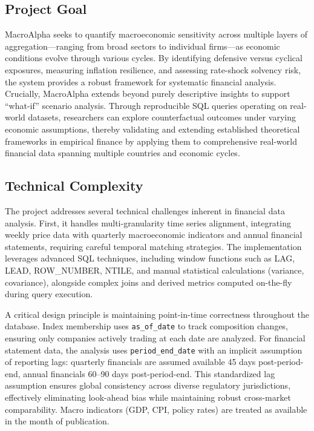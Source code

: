 \documentclass[10pt,a4paper]{article}
\begin{document}
\subsection{Project Goal}
MacroAlpha seeks to quantify macroeconomic sensitivity across multiple layers of aggregation---ranging from broad sectors to individual firms---as economic conditions evolve through various cycles. By identifying defensive versus cyclical exposures, measuring inflation resilience, and assessing rate-shock solvency risk, the system provides a robust framework for systematic financial analysis. Crucially, MacroAlpha extends beyond purely descriptive insights to support ``what-if'' scenario analysis. Through reproducible SQL queries operating on real-world datasets, researchers can explore counterfactual outcomes under varying economic assumptions, thereby validating and extending established theoretical frameworks in empirical finance by applying them to comprehensive real-world financial data spanning multiple countries and economic cycles.

\subsection{Technical Complexity}
The project addresses several technical challenges inherent in financial data analysis. First, it handles multi-granularity time series alignment, integrating weekly price data with quarterly macroeconomic indicators and annual financial statements, requiring careful temporal matching strategies. The implementation leverages advanced SQL techniques, including window functions such as LAG, LEAD, ROW\_NUMBER, NTILE, and manual statistical calculations (variance, covariance), alongside complex joins and derived metrics computed on-the-fly during query execution.

A critical design principle is maintaining point-in-time correctness throughout the database. Index membership uses \texttt{as\_of\_date} to track composition changes, ensuring only companies actively trading at each date are analyzed. For financial statement data, the analysis uses \texttt{period\_end\_date} with an implicit assumption of reporting lags: quarterly financials are assumed available 45 days post-period-end, annual financials 60--90 days post-period-end. This standardized lag assumption ensures global consistency across diverse regulatory jurisdictions, effectively eliminating look-ahead bias while maintaining robust cross-market comparability. Macro indicators (GDP, CPI, policy rates) are treated as available in the month of publication.
\end{document}
